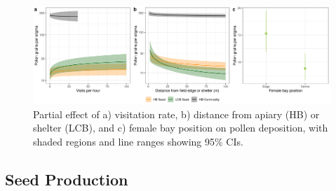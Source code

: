 \documentclass[12pt]{article} %
\begin{document}
\begin{figure}
    \centering
    \includegraphics[width=\textwidth,keepaspectratio=true]{../Figures/allPollen.png}
    \caption{Partial effect of a) visitation rate, b) distance from apiary (HB) or shelter (LCB), and c) female bay position on pollen deposition, with shaded regions and line ranges showing 95\% CIs.}
    \label{fig:allPollen}
\end{figure}


\subsection*{Seed Production}

\end{document}
